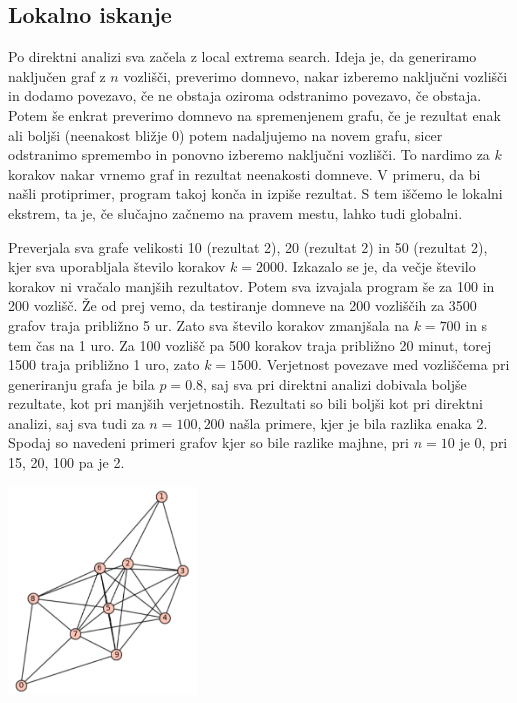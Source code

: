 \documentclass[10pt, a4paper]{article}
\begin{document}
\subsection{Lokalno iskanje}
Po direktni analizi sva začela z local extrema search. Ideja je, da generiramo naključen graf z $n$ vozlišči, preverimo domnevo, nakar izberemo naključni vozlišči in dodamo povezavo, če ne obstaja oziroma odstranimo povezavo, če obstaja. Potem še enkrat preverimo domnevo na spremenjenem grafu, če je rezultat enak ali boljši (neenakost bližje 0) potem nadaljujemo na novem grafu, sicer odstranimo spremembo in ponovno izberemo naključni vozlišči. To nardimo za $k$ korakov nakar vrnemo graf in rezultat neenakosti domneve. V primeru, da bi našli protiprimer, program takoj konča in izpiše rezultat. S tem iščemo le lokalni ekstrem, ta je, če slučajno začnemo na pravem mestu, lahko tudi globalni.

Preverjala sva grafe velikosti 10 (rezultat 2), 20 (rezultat 2) in 50 (rezultat 2), kjer sva uporabljala število korakov $k=2000$. Izkazalo se je, da večje število korakov ni vračalo manjših rezultatov. Potem sva izvajala program še za 100 in 200 vozlišč. Že od prej vemo, da testiranje domneve na 200 vozliščih za 3500 grafov traja približno 5 ur. Zato sva število korakov zmanjšala na $k=700$ in s tem čas na 1 uro. Za 100 vozlišč pa 500 korakov traja približno 20 minut, torej 1500 traja približno 1 uro, zato $k=1500$. Verjetnost povezave med vozliščema pri generiranju grafa je bila $p=0.8$, saj sva pri direktni analizi dobivala boljše rezultate, kot pri manjših verjetnostih. Rezultati so bili boljši kot pri direktni analizi, saj sva tudi za $n=100,200$ našla primere, kjer je bila razlika enaka 2. Spodaj so navedeni primeri grafov kjer so bile razlike majhne, pri $n=10$ je 0, pri 15, 20, 100 pa je 2.

\begin{center}
\includegraphics[width=5cm]{graf_10_0}
\end{center}
\end{document}
